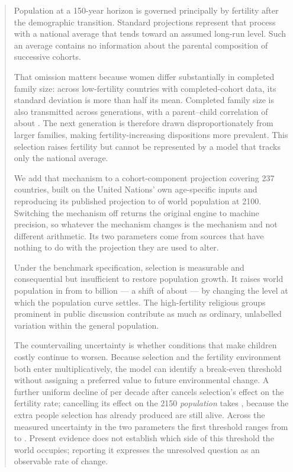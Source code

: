 \begin{abstract}
\noindent
Population at a 150-year horizon is governed principally by fertility after the
demographic transition. Standard projections represent that process with a
national average that tends toward an assumed long-run level. Such an average
contains no information about the parental composition of successive cohorts.

That omission matters because women differ substantially in completed family
size: across low-fertility countries with completed-cohort data, its standard
deviation is more than half its mean. Completed family size is also transmitted
across generations, with a parent--child correlation of about \Persistence{}.
The next generation is therefore drawn disproportionately from larger families,
making fertility-increasing dispositions more prevalent. This selection raises
fertility but cannot be represented by a model that tracks only the national
average.

We add that mechanism to a cohort-component projection covering 237 countries,
built on the United Nations' own age-specific inputs and reproducing its
published projection to \ValidationWorld{} of world population at 2100. Switching
the mechanism off returns the original engine to machine precision, so whatever
the mechanism changes is the mechanism and not different arithmetic. Its two
parameters come from sources that have nothing to do with the projection they are
used to alter.

Under the benchmark specification, selection is measurable and consequential
but insufficient to restore population growth. It raises world population in
\ProjectionEndYear{} from
\LadderBenchmark{} to \LadderMainstream{} billion --- a shift of about
\LadderMainstreamGainPercent{} --- by changing the level at which the population
curve settles. The high-fertility religious groups prominent in public
discussion contribute \NamedGroupShareOfMechanism{} as much as ordinary,
unlabelled variation within the general population.

The countervailing uncertainty is whether conditions that make children costly
continue to worsen. Because selection and the fertility environment both enter
multiplicatively, the model can identify a break-even threshold without assigning
a preferred value to future environmental change. A further uniform decline of
\BoundaryPaired{} per decade after \PressureFromYear{} cancels selection's effect
on the fertility rate; cancelling its effect on the 2150
\emph{population} takes \BoundaryPopulation{}, because the extra people selection
has already produced are still alive. Across the measured uncertainty in the two
parameters the first threshold ranges from \BoundaryFloor{} to
\BoundaryCeiling{}. Present evidence does not establish which side of this
threshold the world occupies; reporting it expresses the unresolved question as
an observable rate of change.
\end{abstract}
